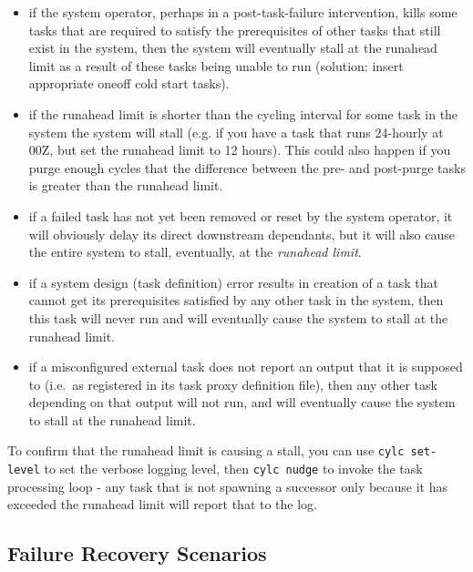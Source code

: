 \documentclass[11pt,a4paper]{article}
\begin{document}
\begin{itemize}
    \item if the system operator, perhaps in a post-task-failure
    intervention, kills some tasks that are required to satisfy the
    prerequisites of other tasks that still exist in the system, then 
    the system will eventually stall at the runahead limit as a
    result of these tasks being unable to run (solution: insert
    appropriate oneoff cold start tasks).

    \item if the runahead limit is shorter than the cycling
    interval for some task in the system the system will stall (e.g. if
    you have a task that runs 24-hourly at 00Z, but set the runahead
    limit to 12 hours). This could also happen if you purge enough
    cycles that the difference between the pre- and post-purge tasks
    is greater than the runahead limit.

    \item if a failed task has not yet been removed or reset by the
    system operator, it will obviously delay its direct downstream
    dependants, but it will also cause the entire system to stall,
    eventually, at the {\em runahead limit}.  

    \item if a system design (task definition) error results in creation
    of a task that cannot get its prerequisites satisfied by any other
    task in the system, then this task will never run and will
    eventually cause the system to stall at the runahead limit.

    \item if a misconfigured external task does not report an output
    that it is supposed to (i.e.\ as registered in its task proxy
    definition file), then any other task depending on that output will
    not run, and will eventually cause the system to stall at the
    runahead limit.

\end{itemize}

To confirm that the runahead limit is causing a stall, you can use 
\lstinline=cylc set-level= to set the verbose logging level, then
\lstinline=cylc nudge= to invoke the task processing loop - any task
that is not spawning a successor only because it has exceeded the runahead
limit will report that to the log.


\subsection{Failure Recovery Scenarios}
\label{FailureRecoveryScenarios}
\end{document}
